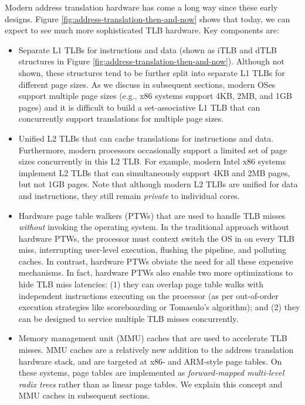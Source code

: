 \documentclass{article}
\begin{document}
Modern address translation hardware has come a long way since these early designs. Figure \ref{fig:address-translation-then-and-now} shows that today, we can expect to see much more sophisticated TLB hardware. Key components are:

\begin{itemize}
    \item Separate L1 TLBs for instructions and data (shown as iTLB and dTLB structures in Figure \ref{fig:address-translation-then-and-now}). Although not shown, these structures tend to be further split into separate L1 TLBs for different page sizes. As we discuss in subsequent sections, modern OSes support multiple page sizes (e.g., x86 systems support 4KB, 2MB, and 1GB pages) and it is difficult to build a set-associative L1 TLB that can concurrently support translations for multiple page sizes. 
    
    \item Unified L2 TLBs that can cache translations for instructions and data. Furthermore, modern processors occasionally support a limited set of page sizes concurrently in this L2 TLB. For example, modern Intel x86 systems implement L2 TLBs that can simultaneously support 4KB and 2MB pages, but not 1GB pages. Note that although modern L2 TLBs are unified for data and instructions, they still remain {\it private} to individual cores.
    
    \item Hardware page table walkers (PTWs) that are used to handle TLB misses {\it without} invoking the operating system. In the traditional approach without hardware PTWs, the processor must context switch the OS in on every TLB miss, interrupting user-level execution, flushing the pipeline, and polluting caches. In contrast, hardware PTWs obviate the need for all these expensive mechanisms. In fact, hardware PTWs also enable two more optimizations to hide TLB miss latencies: (1) they can overlap page table walks with independent instructions executing on the processor (as per out-of-order execution strategies like scoreboarding or Tomasulo's algorithm); and (2) they can be designed to service multiple TLB misses concurrently. 
    
    \item Memory management unit (MMU) caches that are used to accelerate TLB misses. MMU caches are a relatively new addition to the address translation hardware stack, and are targeted at x86- and ARM-style page tables. On these systems, page tables are implemented as {\it forward-mapped multi-level radix trees} rather than as linear page tables. We explain this concept and MMU caches in subsequent sections.
    

\end{itemize}
\end{document}
